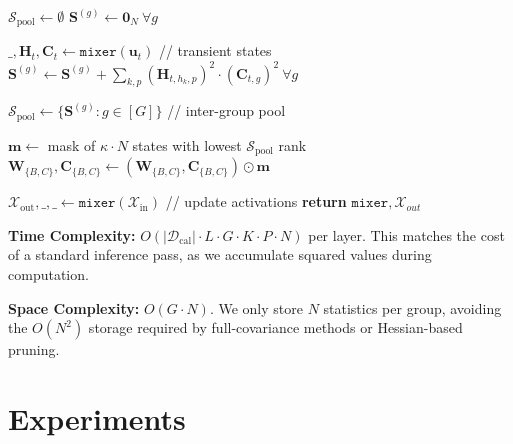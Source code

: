 \documentclass{article}
\theoremstyle{plain}
\theoremstyle{definition}
\theoremstyle{remark}
\begin{document}
\begin{algorithm}[h]
\caption{\texttt{GHOST}: Given \texttt{Mamba2} layer \texttt{mixer} and inputs $\mathcal{X}_{\text{in}}$, we prune state dimension $N$ to $(1 - \kappa) \cdot N$.}
\label{alg:ghost}
\begin{algorithmic}   
\STATE $\mathcal{S}_{\text{pool}} \leftarrow \emptyset$
\STATE $\bm{S}^{(g)} \leftarrow \bm{0}_{N} \ \forall g$


\STATE $\_, \bm{H}_t, \bm{C}_t \leftarrow \texttt{mixer}(\bm{u}_t)$ // transient states
\STATE $\bm{S}^{(g)} \leftarrow \bm{S}^{(g)} + \sum_{k, p} (\bm{H}_{t,h_k,p})^2 \cdot (\bm{C}_{t,g})^2 \ \forall g$

\ENDFOR
\ENDFOR

\STATE $\mathcal{S}_{\text{pool}} \leftarrow \{ \bm{S}^{(g)} : g \in [G]\}$ // inter-group pool

\STATE $\bm{m} \leftarrow$ mask of $\kappa \cdot N$ states with lowest $\mathcal{S}_{\text{pool}}$ rank
\STATE $\bm{W}_{\{B, C\}}, \bm{C}_{\{B, C\}} \leftarrow \left( \bm{W}_{\{B, C\}}, \bm{C}_{\{B, C\}} \right) \odot \bm{m}$

\STATE $\mathcal{X}_{\text{out}}, \_, \_ \leftarrow \texttt{mixer}(\mathcal{X}_{\text{in}})$ // update activations
\STATE \textbf{return} $\texttt{mixer}, \mathcal{X}_{out}$
\end{algorithmic}
\end{algorithm}

\textbf{Time Complexity:} $O(|\mathcal{D}_{\text{cal}}| \cdot L \cdot G \cdot K \cdot P \cdot N)$ per layer. This matches the cost of a standard inference pass, as we accumulate squared values during computation.

\textbf{Space Complexity:} $O(G \cdot N)$. We only store $N$ statistics per group, avoiding the $O(N^2)$ storage required by full-covariance methods or Hessian-based pruning.


\section{Experiments}

\end{document}

